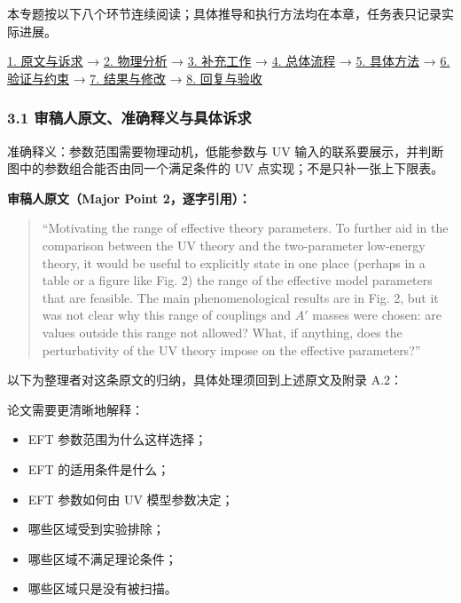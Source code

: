 \documentclass[
]{article}
\providecommand{\tightlist}{%
  \setlength{\itemsep}{0pt}\setlength{\parskip}{0pt}}
\begin{document}
本专题按以下八个环节连续阅读；具体推导和执行方法均在本章，任务表只记录实际进展。

\hyperref[major-2-step-1]{1. 原文与诉求} → \hyperref[major-2-step-2]{2.
物理分析} → \hyperref[major-2-step-3]{3. 补充工作} →
\hyperref[major-2-step-4]{4. 总体流程} → \hyperref[major-2-step-5]{5.
具体方法} → \hyperref[major-2-step-6]{6. 验证与约束} →
\hyperref[major-2-step-7]{7. 结果与修改} → \hyperref[major-2-step-8]{8.
回复与验收}

\subsubsection{3.1
审稿人原文、准确释义与具体诉求}\label{ux5ba1ux7a3fux4ebaux539fux6587ux51c6ux786eux91caux4e49ux4e0eux5177ux4f53ux8bc9ux6c42-1}

准确释义：参数范围需要物理动机，低能参数与 UV
输入的联系要展示，并判断图中的参数组合能否由同一个满足条件的 UV
点实现；不是只补一张上下限表。

\textbf{审稿人原文（Major Point 2，逐字引用）：}

\begin{quote}
``Motivating the range of effective theory parameters. To further aid in
the comparison between the UV theory and the two-parameter low-energy
theory, it would be useful to explicitly state in one place (perhaps in
a table or a figure like Fig. 2) the range of the effective model
parameters that are feasible. The main phenomenological results are in
Fig. 2, but it was not clear why this range of couplings and \(A'\)
masses were chosen: are values outside this range not allowed? What, if
anything, does the perturbativity of the UV theory impose on the
effective parameters?''
\end{quote}

以下为整理者对这条原文的归纳，具体处理须回到上述原文及附录 A.2：

论文需要更清晰地解释：

\begin{itemize}
\tightlist
\item
  EFT 参数范围为什么这样选择；
\item
  EFT 的适用条件是什么；
\item
  EFT 参数如何由 UV 模型参数决定；
\item
  哪些区域受到实验排除；
\item
  哪些区域不满足理论条件；
\item
  哪些区域只是没有被扫描。
\end{itemize}
\end{document}
